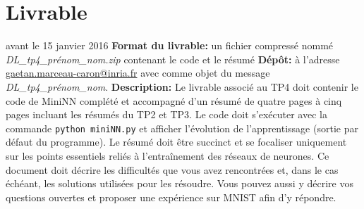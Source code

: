 \documentclass{article}
\begin{document}
\section{Livrable}
 avant le 15 janvier 2016 \newline
{\bf Format du livrable:} un fichier compressé nommé {\it DL\_tp4\_prénom\_nom.zip} contenant le code et le résumé \newline
{\bf Dépôt:} à l'adresse \url{gaetan.marceau-caron@inria.fr} avec comme objet du message {\it DL\_tp4\_prénom\_nom}.\newline
{\bf Description:}\newline
Le livrable associé au TP4 doit contenir le code de MiniNN complété et accompagné d'un résumé de quatre pages à cinq pages incluant les résumés du TP2 et TP3.
Le code doit s'exécuter avec la commande \texttt{python miniNN.py} et afficher l'évolution de l'apprentissage (sortie par défaut du programme).
Le résumé doit être succinct et se focaliser uniquement sur les points essentiels reliés à l'entraînement des réseaux de neurones.
Ce document doit décrire les difficultés que vous avez rencontrées et, dans le cas échéant, les solutions utilisées pour les résoudre.
Vous pouvez aussi y décrire vos questions ouvertes et proposer une expérience sur MNIST afin d'y répondre.     

\printbibliography
\end{document}
